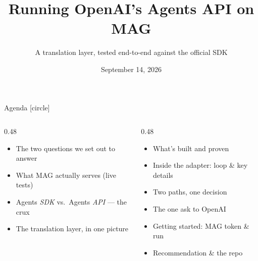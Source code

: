 

\title{Running OpenAI's Agents API on MAG}
\subtitle{A translation layer, tested end-to-end against the official SDK}
\date{September 14, 2026}





\begin{frame}{Agenda}
  [circle]
  \begin{columns}[t, totalwidth=\textwidth]
    \begin{column}{0.48\textwidth}
      \begin{itemize}
        \item[\faQuestionCircle] The two questions we set out to answer
        \item[\faVial] What MAG actually serves (live tests)
        \item[\faCodeBranch] Agents \emph{SDK} vs.\ Agents \emph{API} --- the crux
        \item[\faProjectDiagram] The translation layer, in one picture
      \end{itemize}
    \end{column}
    \begin{column}{0.48\textwidth}
      \begin{itemize}
        \item[\faCheckDouble] What's built and proven
        \item[\faIcon{cogs}] Inside the adapter: loop \& key details
        \item[\faRoute] Two paths, one decision
        \item[\faBullhorn] The one ask to OpenAI
        \item[\faKey] Getting started: MAG token \& run
        \item[\faFlagCheckered] Recommendation \& the repo
      \end{itemize}
    \end{column}
  \end{columns}
\end{frame}

